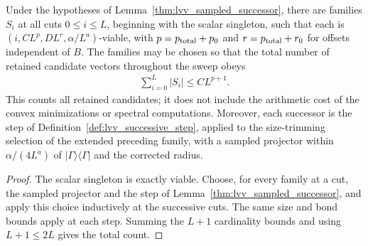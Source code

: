 \begin{lemma}
    \label{thm:lvv_sampled_successive_families}
    \leanok
    Under the hypotheses of Lemma~\ref{thm:lvv_sampled_successor}, there
    are families $S_i$ at all cuts $0\le i\le L$, beginning with the scalar
    singleton, such that each is $(i,CL^p,DL^r,\alpha/L^a)$-viable, with
    $p=p_{\rm total}+p_0$ and $r=p_{\rm total}+r_0$ for offsets independent
    of $B$.  The families may be chosen so that the total number of retained
    candidate vectors throughout the sweep obeys
    \begin{align*}
        \sum_{i=0}^{L}|S_i|\le CL^{p+1}.
    \end{align*}
    This counts all retained candidates; it does not include the arithmetic
    cost of the convex minimizations or spectral computations.
    Moreover, each successor is the step of
    Definition~\ref{def:lvv_successive_step}, applied to the size-trimming
    selection of the extended preceding family, with a sampled projector
    within $\alpha/(4L^a)$ of $|\Gamma\rangle\langle\Gamma|$ and the corrected radius.
\end{lemma}
\begin{proof}
    \leanok
    The scalar singleton is exactly viable. Choose, for every family at a
    cut, the sampled projector and the step of
    Lemma~\ref{thm:lvv_sampled_successor}, and apply this choice
    inductively at the successive cuts. The same size and bond bounds
    apply at each step.
    Summing the $L+1$ cardinality bounds and using $L+1\le2L$ gives the total count.
\end{proof}

